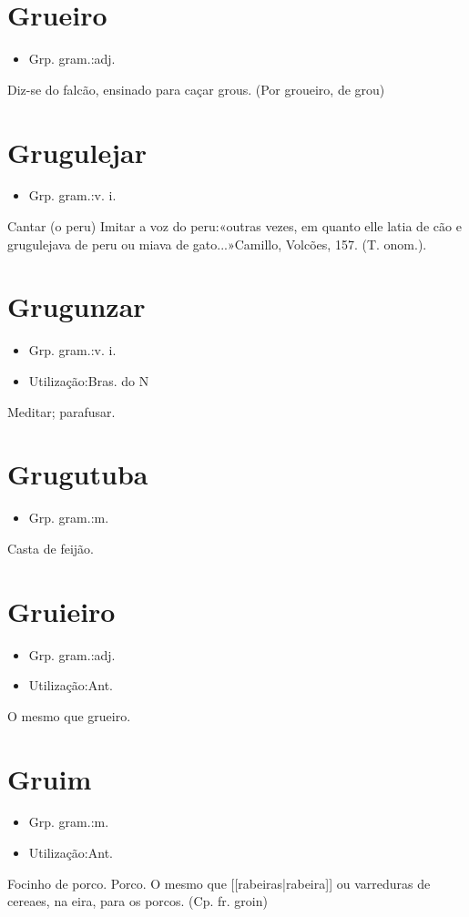 \section{Grueiro}
\begin{itemize}
\item {Grp. gram.:adj.}
\end{itemize}
Diz-se do falcão, ensinado para caçar grous.
(Por \textunderscore groueiro\textunderscore , de \textunderscore grou\textunderscore )
\section{Grugulejar}
\begin{itemize}
\item {Grp. gram.:v. i.}
\end{itemize}
Cantar (o peru)
Imitar a voz do peru:«\textunderscore outras vezes, em quanto elle latia de cão e grugulejava de peru ou miava de gato...\textunderscore »Camillo, \textunderscore Volcões\textunderscore , 157. (T. onom.).
\section{Grugunzar}
\begin{itemize}
\item {Grp. gram.:v. i.}
\end{itemize}
\begin{itemize}
\item {Utilização:Bras. do N}
\end{itemize}
Meditar; parafusar.
\section{Grugutuba}
\begin{itemize}
\item {Grp. gram.:m.}
\end{itemize}
Casta de feijão.
\section{Gruieiro}
\begin{itemize}
\item {Grp. gram.:adj.}
\end{itemize}
\begin{itemize}
\item {Utilização:Ant.}
\end{itemize}
O mesmo que \textunderscore grueiro\textunderscore .
\section{Gruim}
\begin{itemize}
\item {Grp. gram.:m.}
\end{itemize}
\begin{itemize}
\item {Utilização:Ant.}
\end{itemize}
Focinho de porco.
Porco.
O mesmo que [[rabeiras|rabeira]] ou varreduras de cereaes, na eira, para os porcos.
(Cp. fr. \textunderscore groin\textunderscore )
